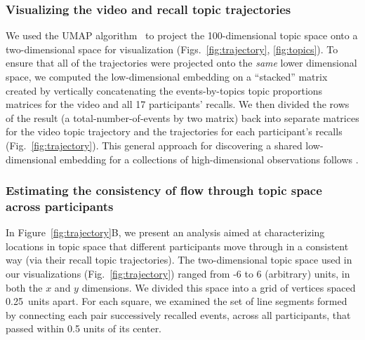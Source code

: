 \documentclass{article}
\begin{document}
\subsubsection*{Visualizing the video and recall topic trajectories}
We used the UMAP algorithm~\citep{McInHeal18} to project the 100-dimensional topic space onto a two-dimensional space for visualization (Figs.~\ref{fig:trajectory}, \ref{fig:topics}).  To ensure that all of the trajectories were projected onto the \textit{same} lower dimensional space, we computed the low-dimensional embedding on a ``stacked'' matrix created by vertically concatenating the events-by-topics topic proportions matrices for the video and all 17 participants' recalls.  We then divided the rows of the result (a total-number-of-events by two matrix) back into separate matrices for the video topic trajectory and the trajectories for each participant's recalls (Fig.~\ref{fig:trajectory}).  This general approach for discovering a shared low-dimensional embedding for a collections of high-dimensional observations follows \cite{HeusEtal18}.

\subsubsection*{Estimating the consistency of flow through topic space across participants}
In Figure~\ref{fig:trajectory}B, we present an analysis aimed at characterizing locations in topic space that different participants move through in a consistent way (via their recall topic trajectories).  The two-dimensional topic space used in our visualizations (Fig.~\ref{fig:trajectory}) ranged from -6 to 6 (arbitrary) units, in both the $x$ and $y$ dimensions.  We divided this space into a grid of vertices spaced 0.25~units apart.  For each square, we examined the set of line segments formed by connecting each pair successively recalled events, across all participants, that passed within 0.5 units of its center.
\end{document}

